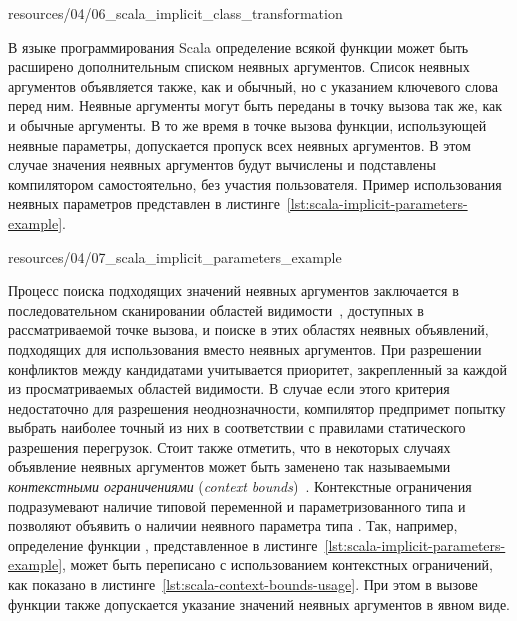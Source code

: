 \newpage


{resources/04/06_scala_implicit_class_transformation}

В языке программирования Scala определение всякой функции может быть расширено дополнительным списком неявных аргументов. Список неявных аргументов объявляется также, как и обычный, но с указанием ключевого слова  перед ним. Неявные аргументы могут быть переданы в точку вызова так же, как и обычные аргументы. В то же время в точке вызова функции, использующей неявные параметры, допускается пропуск всех неявных аргументов. В этом случае значения неявных аргументов будут вычислены и подставлены компилятором самостоятельно, без участия пользователя. Пример использования неявных параметров представлен в листинге~\ref{lst:scala-implicit-parameters-example}. 


{resources/04/07_scala_implicit_parameters_example}

Процесс поиска подходящих значений неявных аргументов заключается в последовательном сканировании областей видимости~\cite{implicits-resolution}, доступных в рассматриваемой точке вызова, и поиске в этих областях неявных объявлений, подходящих для использования вместо неявных аргументов. При разрешении конфликтов между кандидатами учитывается приоритет, закрепленный за каждой из просматриваемых областей видимости. В случае если этого критерия недостаточно для разрешения неоднозначности, компилятор предпримет попытку выбрать наиболее точный из них в соответствии с правилами статического разрешения перегрузок. Стоит также отметить, что в некоторых случаях объявление неявных аргументов может быть заменено так называемыми \emph{контекстными ограничениями} (\emph{context bounds})~\cite{context-bounds}. Контекстные ограничения подразумевают наличие типовой переменной  и параметризованного типа  и позволяют объявить о наличии неявного параметра типа . Так, например, определение функции , представленное в листинге~\ref{lst:scala-implicit-parameters-example}, может быть переписано с использованием контекстных ограничений, как показано в листинге~\ref{lst:scala-context-bounds-usage}. При этом в вызове функции  также допускается указание значений неявных аргументов в явном виде. 

